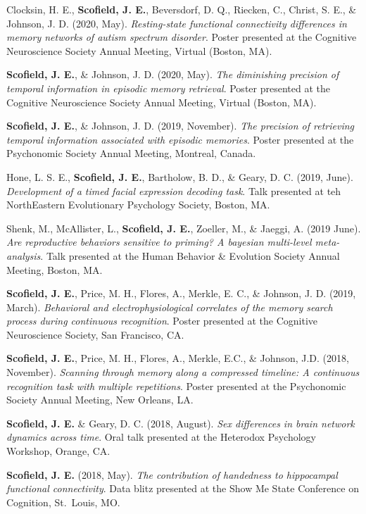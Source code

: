 \documentclass[11pt, a4paper]{awesome-cv}
\begin{document}
Clocksin, H. E., \textbf{Scofield, J. E.}, Beversdorf, D. Q., Riecken, C., Christ, S. E., \& Johnson, J. D. (2020, May). \emph{Resting-state functional connectivity differences in memory networks of autism spectrum disorder}. Poster presented at the Cognitive Neuroscience Society Annual Meeting, Virtual (Boston, MA).

\textbf{Scofield, J. E.}, \& Johnson, J. D. (2020, May). \emph{The diminishing precision of temporal information in episodic memory retrieval}. Poster presented at the Cognitive Neuroscience Society Annual Meeting, Virtual (Boston, MA).

\textbf{Scofield, J. E.}, \& Johnson, J. D. (2019, November). \emph{The precision of retrieving temporal information associated with episodic memories}. Poster presented at the Psychonomic Society Annual Meeting, Montreal, Canada.

Hone, L. S. E., \textbf{Scofield, J. E.}, Bartholow, B. D., \& Geary, D. C. (2019, June). \emph{Development of a timed facial expression decoding task}. Talk presented at teh NorthEastern Evolutionary Psychology Society, Boston, MA.

Shenk, M., McAllister, L., \textbf{Scofield, J. E.}, Zoeller, M., \& Jaeggi, A. (2019 June). \emph{Are reproductive behaviors sensitive to priming? A bayesian multi-level meta-analysis}. Talk presented at the Human Behavior \& Evolution Society Annual Meeting, Boston, MA.

\textbf{Scofield, J. E.}, Price, M. H., Flores, A., Merkle, E. C., \& Johnson, J. D. (2019, March). \emph{Behavioral and electrophysiological correlates of the memory search process during continuous recognition}. Poster presented at the Cognitive Neuroscience Society, San Francisco, CA.

\textbf{Scofield, J. E.}, Price, M. H., Flores, A., Merkle, E.C., \& Johnson, J.D. (2018, November). \emph{Scanning through memory along a compressed timeline: A continuous recognition task with multiple repetitions}. Poster presented at the Psychonomic Society Annual Meeting, New Orleans, LA.

\textbf{Scofield, J. E.} \& Geary, D. C. (2018, August). \emph{Sex differences in brain network dynamics across time}. Oral talk presented at the Heterodox Psychology Workshop, Orange, CA.

\textbf{Scofield, J. E.} (2018, May). \emph{The contribution of handedness to hippocampal functional connectivity}. Data blitz presented at the Show Me State Conference on Cognition, St.~Louis, MO.
\end{document}
